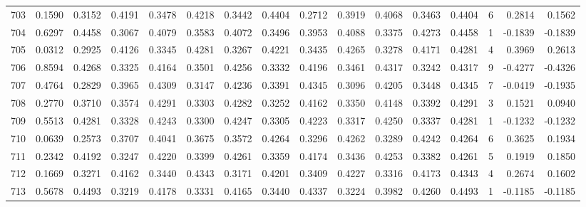 \begin{tabular}{lrrrrrrrrrrrrrrr}
703 &      0.1590 &  0.3152 &  0.4191 &  0.3478 &  0.4218 &  0.3442 &  0.4404 &  0.2712 &  0.3919 &  0.4068 &   0.3463 &     0.4404 &      6 &                    0.2814 &                     0.1562 \\
704 &      0.6297 &  0.4458 &  0.3067 &  0.4079 &  0.3583 &  0.4072 &  0.3496 &  0.3953 &  0.4088 &  0.3375 &   0.4273 &     0.4458 &      1 &                   -0.1839 &                    -0.1839 \\
705 &      0.0312 &  0.2925 &  0.4126 &  0.3345 &  0.4281 &  0.3267 &  0.4221 &  0.3435 &  0.4265 &  0.3278 &   0.4171 &     0.4281 &      4 &                    0.3969 &                     0.2613 \\
706 &      0.8594 &  0.4268 &  0.3325 &  0.4164 &  0.3501 &  0.4256 &  0.3332 &  0.4196 &  0.3461 &  0.4317 &   0.3242 &     0.4317 &      9 &                   -0.4277 &                    -0.4326 \\
707 &      0.4764 &  0.2829 &  0.3965 &  0.4309 &  0.3147 &  0.4236 &  0.3391 &  0.4345 &  0.3096 &  0.4205 &   0.3448 &     0.4345 &      7 &                   -0.0419 &                    -0.1935 \\
708 &      0.2770 &  0.3710 &  0.3574 &  0.4291 &  0.3303 &  0.4282 &  0.3252 &  0.4162 &  0.3350 &  0.4148 &   0.3392 &     0.4291 &      3 &                    0.1521 &                     0.0940 \\
709 &      0.5513 &  0.4281 &  0.3328 &  0.4243 &  0.3300 &  0.4247 &  0.3305 &  0.4223 &  0.3317 &  0.4250 &   0.3337 &     0.4281 &      1 &                   -0.1232 &                    -0.1232 \\
710 &      0.0639 &  0.2573 &  0.3707 &  0.4041 &  0.3675 &  0.3572 &  0.4264 &  0.3296 &  0.4262 &  0.3289 &   0.4242 &     0.4264 &      6 &                    0.3625 &                     0.1934 \\
711 &      0.2342 &  0.4192 &  0.3247 &  0.4220 &  0.3399 &  0.4261 &  0.3359 &  0.4174 &  0.3436 &  0.4253 &   0.3382 &     0.4261 &      5 &                    0.1919 &                     0.1850 \\
712 &      0.1669 &  0.3271 &  0.4162 &  0.3440 &  0.4343 &  0.3171 &  0.4201 &  0.3409 &  0.4227 &  0.3316 &   0.4173 &     0.4343 &      4 &                    0.2674 &                     0.1602 \\
713 &      0.5678 &  0.4493 &  0.3219 &  0.4178 &  0.3331 &  0.4165 &  0.3440 &  0.4337 &  0.3224 &  0.3982 &   0.4260 &     0.4493 &      1 &                   -0.1185 &                    -0.1185 \\

\end{tabular}
